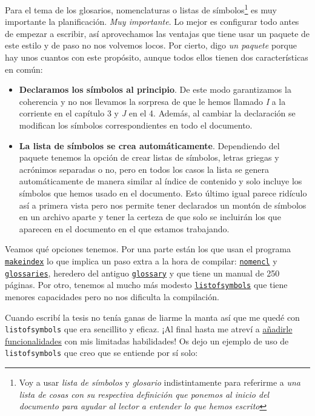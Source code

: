 Para el tema de los glosarios, nomenclaturas o listas de
símbolos\footnote{Voy a usar \emph{lista de símbolos} y \emph{glosario}
  indistintamente para referirme a \emph{una lista de cosas con su
  respectiva definición que ponemos al inicio del documento para ayudar
  al lector a entender lo que hemos escrito}} es muy importante la
planificación. \emph{Muy importante}. Lo mejor es configurar todo antes
de empezar a escribir, así aprovechamos las ventajas que tiene usar un
paquete de este estilo y de paso no nos volvemos locos. Por cierto, digo
\emph{un paquete} porque hay unos cuantos con este propósito, aunque
todos ellos tienen dos características en común:

\begin{itemize}
\item
  \textbf{Declaramos los símbolos al principio}. De este modo
  garantizamos la coherencia y no nos llevamos la sorpresa de que le
  hemos llamado \emph{I} a la corriente en el capítulo 3 y \emph{J} en
  el 4. Además, al cambiar la declaración se modifican los símbolos
  correspondientes en todo el documento.
\item
  \textbf{La lista de símbolos se crea automáticamente}. Dependiendo del
  paquete tenemos la opción de crear listas de símbolos, letras griegas
  y acrónimos separadas o no, pero en todos los casos la lista se genera
  automáticamente de manera similar al índice de contenido y solo
  incluye los símbolos que hemos usado en el documento. Esto último
  igual parece ridículo así a primera vista pero nos permite tener
  declarados un montón de símbolos en un archivo aparte y tener la
  certeza de que solo se incluirán los que aparecen en el documento en
  el que estamos trabajando.
\end{itemize}

Veamos qué opciones tenemos. Por una parte están los que usan el
programa
\href{http://tex.loria.fr/bibdex/makeindex.pdf}{\lstinline!makeindex!}
lo que implica un paso extra a la hora de compilar:
\href{http://www.ctan.org/pkg/nomencl}{\lstinline!nomencl!} y
\href{http://www.ctan.org/tex-archive/macros/latex/contrib/glossaries/}{\lstinline!glossaries!},
heredero del antiguo
\href{http://www.ctan.org/pkg/glossary}{\lstinline!glossary!} y que
tiene un manual de 250 páginas. Por otro, tenemos al mucho más modesto
\href{https://www.ctan.org/pkg/listofsymbols}{\lstinline!listofsymbols!}
que tiene menores capacidades pero no nos dificulta la compilación.

Cuando escribí la tesis no tenía ganas de liarme la manta así que me
quedé con \lstinline!listofsymbols! que era sencillito y eficaz. ¡Al
final hasta me atreví a \href{https://gitlab.com/Ondiz/los}{añadirle
funcionalidades} con mis limitadas habilidades! Os dejo un ejemplo de
uso de \lstinline!listofsymbols! que creo que se entiende por sí solo:

